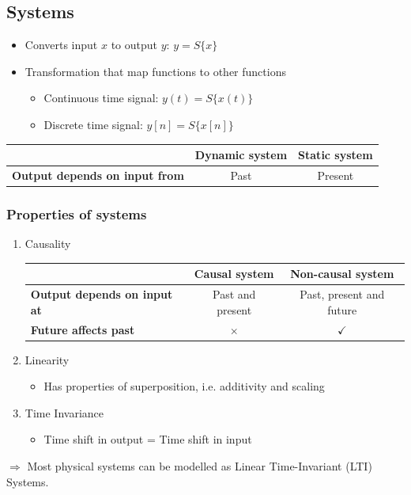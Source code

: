 \documentclass[a4paper]{article}
\begin{document}
\subsection{Systems}
\begin{itemize}
    \item Converts input $x$ to output $y$: \quad $y = S\{x\}$
    \item Transformation that map functions to other functions
    \begin{itemize}[label=$\circ$]
        \item Continuous time signal: $y(t) = S\{x(t)\}$
        \item Discrete time signal: $y[n] = S\{x[n]\}$
    \end{itemize}
\end{itemize}
\begin{table}[H]
\centering
\begin{tabular}{l|c|c|}
\cline{2-3}
                                                            & \textbf{Dynamic system} & \textbf{Static system} \\ \hline
\multicolumn{1}{|l|}{\textbf{Output depends on input from}} & Past                    & Present                \\ \hline
\end{tabular}
\end{table}
\subsubsection{Properties of systems}
\begin{enumerate}[label=\alph*.]
    \item Causality
\begin{table}[H]
\centering
\begin{tabular}{l|c|c|}
\cline{2-3}
                                                          & \textbf{Causal system} & \textbf{Non-causal system} \\ \hline
\multicolumn{1}{|l|}{\textbf{Output depends on input at}} & Past and present       & Past, present and future   \\ \hline
\multicolumn{1}{|l|}{\textbf{Future affects past}}        & $\times$               & $\checkmark$               \\ \hline
\end{tabular}
\end{table}
\item Linearity
\begin{itemize}
    \item Has properties of superposition, i.e. additivity and scaling
\end{itemize}
\item Time Invariance
\begin{itemize}
    \item Time shift in output = Time shift in input
\end{itemize}
\end{enumerate}
$\Rightarrow$ Most physical systems can be modelled as Linear Time-Invariant (LTI) Systems.
\end{document}
